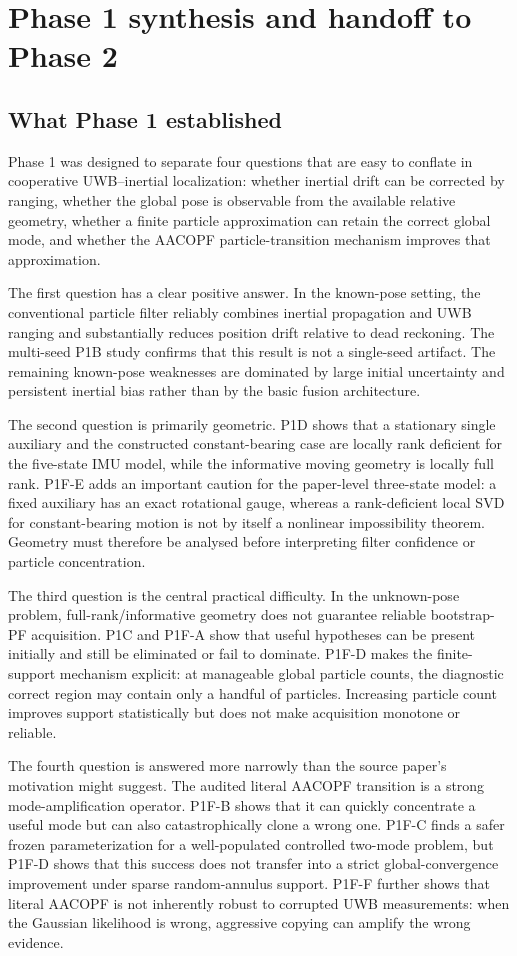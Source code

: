 \section{Phase 1 synthesis and handoff to Phase 2}
\subsection{What Phase 1 established}
Phase 1 was designed to separate four questions that are easy to conflate in cooperative UWB--inertial localization: whether inertial drift can be corrected by ranging, whether the global pose is observable from the available relative geometry, whether a finite particle approximation can retain the correct global mode, and whether the AACOPF particle-transition mechanism improves that approximation.

The first question has a clear positive answer. In the known-pose setting, the conventional particle filter reliably combines inertial propagation and UWB ranging and substantially reduces position drift relative to dead reckoning. The multi-seed P1B study confirms that this result is not a single-seed artifact. The remaining known-pose weaknesses are dominated by large initial uncertainty and persistent inertial bias rather than by the basic fusion architecture.

The second question is primarily geometric. P1D shows that a stationary single auxiliary and the constructed constant-bearing case are locally rank deficient for the five-state IMU model, while the informative moving geometry is locally full rank. P1F-E adds an important caution for the paper-level three-state model: a fixed auxiliary has an exact rotational gauge, whereas a rank-deficient local SVD for constant-bearing motion is not by itself a nonlinear impossibility theorem. Geometry must therefore be analysed before interpreting filter confidence or particle concentration.

The third question is the central practical difficulty. In the unknown-pose problem, full-rank/informative geometry does not guarantee reliable bootstrap-PF acquisition. P1C and P1F-A show that useful hypotheses can be present initially and still be eliminated or fail to dominate. P1F-D makes the finite-support mechanism explicit: at manageable global particle counts, the diagnostic correct region may contain only a handful of particles. Increasing particle count improves support statistically but does not make acquisition monotone or reliable.

The fourth question is answered more narrowly than the source paper's motivation might suggest. The audited literal AACOPF transition is a strong mode-amplification operator. P1F-B shows that it can quickly concentrate a useful mode but can also catastrophically clone a wrong one. P1F-C finds a safer frozen parameterization for a well-populated controlled two-mode problem, but P1F-D shows that this success does not transfer into a strict global-convergence improvement under sparse random-annulus support. P1F-F further shows that literal AACOPF is not inherently robust to corrupted UWB measurements: when the Gaussian likelihood is wrong, aggressive copying can amplify the wrong evidence.

